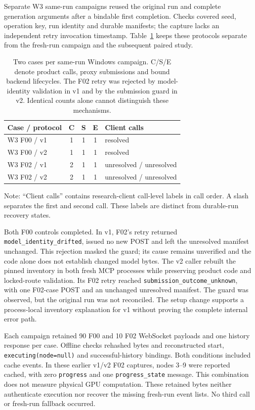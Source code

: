 \documentclass[conference,letterpaper,10pt]{IEEEtran}
\begin{document}
Separate W3 same-run campaigns reused the original run and complete generation
arguments after a bindable first completion. Checks covered seed, operation key,
run identity and durable manifests; the capture lacks an independent retry
invocation timestamp. Table~\ref{tab:samerun} keeps these protocols separate
from the fresh-run campaign and the subsequent paired study.

\begin{table}[t]
\caption{Two cases per same-run Windows campaign. C/S/E denote product calls,
proxy submissions and bound backend lifecycles. The F02 retry was rejected
by model-identity validation in v1 and by the submission guard in v2.
Identical counts alone cannot distinguish these mechanisms.}
\label{tab:samerun}
\centering
\begin{tabular}{lcccl}
\hline
Case / protocol & C & S & E & Client calls \\
\hline
W3 F00 / v1 & 1 & 1 & 1 & resolved \\
W3 F00 / v2 & 1 & 1 & 1 & resolved \\
W3 F02 / v1 & 2 & 1 & 1 & unresolved / unresolved \\
W3 F02 / v2 & 2 & 1 & 1 & unresolved / unresolved \\
\hline
\end{tabular}
\par\smallskip
\begin{minipage}{\columnwidth}\footnotesize\raggedright
Note: ``Client calls'' contains research-client call-level labels in call order.
A slash separates the first and second call. These labels are distinct from
durable-run recovery states.
\end{minipage}
\end{table}

Both F00 controls completed. In v1, F02's retry returned
\texttt{model\_identity\_drifted}, issued no new POST and left the unresolved
manifest unchanged. This rejection masked the guard; its cause remains
unverified and the code alone does not establish changed model bytes.
The v2 caller rebuilt the pinned inventory in both fresh MCP processes while
preserving product code and locked-route validation. Its F02 retry reached
\texttt{submission\_outcome\_unknown}, with one F02-case POST and an unchanged
unresolved manifest. The guard was observed, but the original run was not
reconciled. The setup change supports a process-local inventory explanation
for v1 without proving the complete internal error path.

Each campaign retained 90 F00 and 10 F02 WebSocket payloads and one history
response per case. Offline checks rehashed bytes and reconstructed start,
\texttt{executing(node=null)} and successful-history bindings. Both conditions
included cache events. In these earlier v1/v2 F02 captures, nodes 3--9 were
reported cached, with zero \texttt{progress} and one \texttt{progress\_state}
message. This combination does not measure physical GPU computation.
These retained bytes neither authenticate execution nor recover
the missing fresh-run event lists. No third call or fresh-run fallback occurred.
\end{document}
